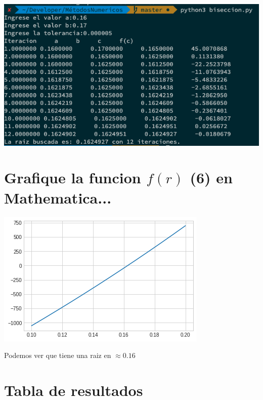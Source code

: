 \documentclass{article}
\begin{document}
\includegraphics[scale=0.5]{salidaBiseccion.png}


\section{Grafique la funcion $f(r)$ (6) en Mathematica...}
\begin{center}
\includegraphics[scale=0.5]{plot.png}
\end{center}

Podemos ver que tiene una raiz en $\approx 0.16$

\section{Tabla de resultados}
\end{document}
